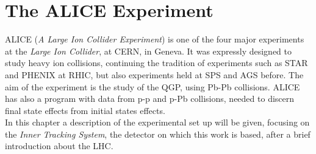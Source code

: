 \chapter{The ALICE Experiment}
ALICE (\textit{A Large Ion Collider Experiment}) is one of the four major experiments at the \textit{Large Ion Collider}, at CERN, in Geneva. It was expressly designed to study heavy ion collisions, continuing the tradition of experiments such as STAR and PHENIX at RHIC, but also experiments held at SPS and AGS before. The aim of the experiment is the study of the QGP, using Pb-Pb collisions. ALICE has also a program with data from p-p and p-Pb collisions, needed to discern final state effects from initial states effects.\\
In this chapter a description of the experimental set up will be given, focusing on the \textit{Inner Tracking System}, the detector on which this work is based, after a brief introduction about the LHC.
